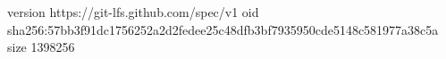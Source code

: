 version https://git-lfs.github.com/spec/v1
oid sha256:57bb3f91dc1756252a2d2fedee25c48dfb3bf7935950cde5148c581977a38c5a
size 1398256
